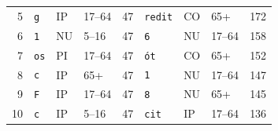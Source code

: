 \begin{tabular}{rlllrlllr}
5 & \texttt{\textvisiblespace{}g} & IP & 17–64 & 47 & \texttt{redit} & CO & 65+ & 172 \\
6 & \texttt{1} & NU & 5–16 & 47 & \texttt{6} & NU & 17–64 & 158 \\
7 & \texttt{\textvisiblespace{}os} & PI & 17–64 & 47 & \texttt{ót} & CO & 65+ & 152 \\
8 & \texttt{\textvisiblespace{}c} & IP & 65+ & 47 & \texttt{1} & NU & 17–64 & 147 \\
9 & \texttt{\textvisiblespace{}F} & IP & 17–64 & 47 & \texttt{8} & NU & 65+ & 145 \\
10 & \texttt{\textvisiblespace{}c} & IP & 5–16 & 47 & \texttt{\textvisiblespace{}cit} & IP & 17–64 & 136 \\
\bottomrule
\end{tabular}

\par{}
